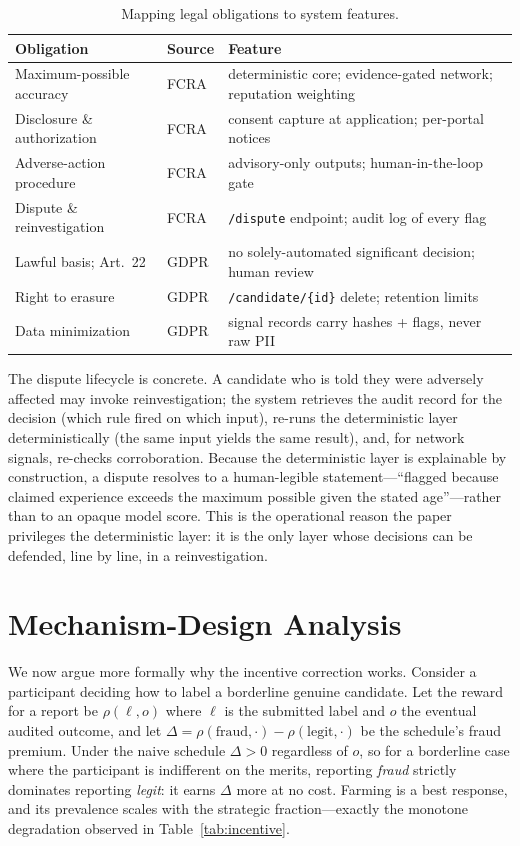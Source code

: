\documentclass[11pt]{article}
\newcommand{\code}[1]{\texttt{\small #1}}
\begin{document}
\begin{table}[t]\centering\small
\caption{Mapping legal obligations to system features.}\label{tab:obligations}
\begin{tabular}{p{3.4cm}p{3.0cm}p{6.2cm}}
\toprule
Obligation & Source & Feature\\
\midrule
Maximum-possible accuracy & FCRA & deterministic core; evidence-gated network; reputation weighting\\
Disclosure \& authorization & FCRA & consent capture at application; per-portal notices\\
Adverse-action procedure & FCRA & advisory-only outputs; human-in-the-loop gate\\
Dispute \& reinvestigation & FCRA & \code{/dispute} endpoint; audit log of every flag\\
Lawful basis; Art.\ 22 & GDPR & no solely-automated significant decision; human review\\
Right to erasure & GDPR & \code{/candidate/\{id\}} delete; retention limits\\
Data minimization & GDPR & signal records carry hashes + flags, never raw PII\\
\bottomrule
\end{tabular}
\end{table}

The dispute lifecycle is concrete. A candidate who is told they were
adversely affected may invoke reinvestigation; the system retrieves the audit
record for the decision (which rule fired on which input), re-runs the
deterministic layer deterministically (the same input yields the same result),
and, for network signals, re-checks corroboration. Because the deterministic
layer is explainable by construction, a dispute resolves to a human-legible
statement---``flagged because claimed experience exceeds the maximum possible
given the stated age''---rather than to an opaque model score. This is the
operational reason the paper privileges the deterministic layer: it is the only
layer whose decisions can be defended, line by line, in a reinvestigation.

\section{Mechanism-Design Analysis}\label{sec:mechanism}
We now argue more formally why the incentive correction works. Consider a
participant deciding how to label a borderline genuine candidate. Let the reward
for a report be $\rho(\ell, o)$ where $\ell$ is the submitted label and $o$ the
eventual audited outcome, and let $\Delta = \rho(\text{fraud}, \cdot) -
\rho(\text{legit}, \cdot)$ be the schedule's fraud premium. Under the naive
schedule $\Delta > 0$ regardless of $o$, so for a borderline case where the
participant is indifferent on the merits, reporting \emph{fraud} strictly
dominates reporting \emph{legit}: it earns $\Delta$ more at no cost. Farming is a
best response, and its prevalence scales with the strategic fraction---exactly the
monotone degradation observed in Table~\ref{tab:incentive}.
\end{document}
